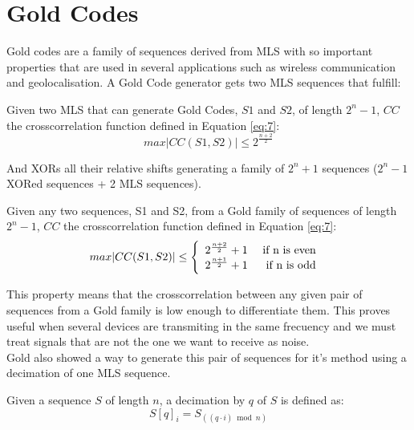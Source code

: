 \section{Gold Codes}

Gold codes are a family of sequences derived from MLS with so
important properties that are used in several applications such as wireless
communication and geolocalisation. A Gold Code generator gets two MLS sequences
that fulfill:

\begin{property}
  Given two MLS that can generate Gold Codes, $S1$ and $S2$, of length $2^{n}-
  1$, $CC$ the crosscorrelation function defined in Equation \ref{eq:7}:
    \begin{equation}\label{gold:eq:1}
      max |CC(S1, S2)| \leq 2^{\frac{n+2}{2}}
    \end{equation}
\end{property}

And XORs all their relative shifts generating a family of $2^{n} + 1$ sequences
($2^{n} - 1$ XORed sequences + 2 MLS sequences).

\begin{property}
  Given any two sequences, S1 and S2, from a Gold family of sequences of length
  $2^{n}-1$, $CC$ the crosscorrelation function defined in Equation \ref{eq:7}:
  \begin{equation}
        max |CC(S1, S2)| \leq \left\{\begin{array}{lr}
            2^{\frac{n+2}{2}}+1 & \textnormal{ if n is even } \\
            2^{\frac{n+1}{2}}+1 & \textnormal{ if n is odd } \\
        \end{array}\right.
  \end{equation}
\end{property}


This property means that the crosscorrelation between any given pair of
sequences from a Gold family is low enough to differentiate them. This proves
useful when several devices are transmiting in the same frecuency and we must
treat signals that are not the one we want to receive as noise.\\

Gold also showed  a way to generate this pair of sequences for it's method
using a decimation of one MLS sequence.

\begin{definition}[Decimation]
  Given a sequence $S$ of length $n$, a decimation by $q$ of $S$ is defined as:
  \begin{equation}
    S[q]_{i} = S_{((q·i) \bmod n)}
  \end{equation}
\end{definition}

